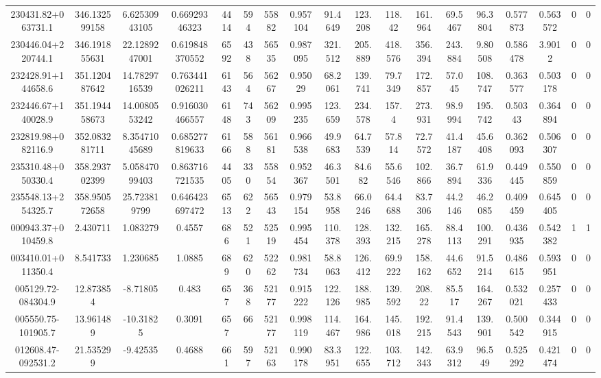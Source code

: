 \begin{table}
\begin{tabular}{cccccccccccccccccc}
230431.82+063731.1 & 346.132599158 & 6.62530943105 & 0.66929346323 & 4414 & 594 & 55882 & 0.957104 & 91.4649 & 123.208 & 118.42 & 161.964 & 69.5467 & 96.3804 & 0.577873 & 0.563572 & 0 & 0 \\
230446.04+220744.1 & 346.191855631 & 22.1289247001 & 0.619848370552 & 6592 & 438 & 56535 & 0.987095 & 321.512 & 205.889 & 418.576 & 356.394 & 243.884 & 9.80508 & 0.586478 & 3.9012 & 0 & 0 \\
232428.91+144658.6 & 351.120487642 & 14.7829716539 & 0.763441026211 & 6143 & 564 & 56267 & 0.95029 & 68.2061 & 139.741 & 79.7349 & 172.857 & 57.045 & 108.747 & 0.363577 & 0.503178 & 0 & 0 \\
232446.67+140028.9 & 351.194458673 & 14.0080553242 & 0.916030466557 & 6148 & 743 & 56209 & 0.995235 & 123.659 & 234.578 & 157.4 & 273.931 & 98.9994 & 195.742 & 0.50343 & 0.364894 & 0 & 0 \\
232819.98+082116.9 & 352.083281711 & 8.35471045689 & 0.685277819633 & 6166 & 588 & 56181 & 0.966538 & 49.9683 & 64.7539 & 57.814 & 72.7572 & 41.4187 & 45.6408 & 0.362093 & 0.506307 & 0 & 0 \\
235310.48+050330.4 & 358.293702399 & 5.05847099403 & 0.863716721535 & 4405 & 330 & 55854 & 0.952367 & 46.3501 & 84.682 & 55.6546 & 102.866 & 36.7894 & 61.9336 & 0.449445 & 0.550859 & 0 & 0 \\
235548.13+254325.7 & 358.950572658 & 25.723819799 & 0.646423697472 & 6513 & 622 & 56543 & 0.979154 & 53.8958 & 66.0246 & 64.4688 & 83.7306 & 44.2146 & 46.2085 & 0.409459 & 0.645405 & 0 & 0 \\
000943.37+010459.8 & 2.430711 & 1.083279 & 0.4557 & 686 & 521 & 52519 & 0.995454 & 110.378 & 128.393 & 132.215 & 165.278 & 88.4113 & 100.291 & 0.436935 & 0.542382 & 1 & 1 \\
003410.01+011350.4 & 8.541733 & 1.230685 & 1.0885 & 689 & 620 & 52262 & 0.981734 & 58.8063 & 126.412 & 69.9222 & 158.162 & 44.6652 & 91.5214 & 0.486615 & 0.593951 & 0 & 0 \\
005129.72-084304.9 & 12.873854 & -8.71805 & 0.483 & 657 & 368 & 52177 & 0.915222 & 122.126 & 188.985 & 139.592 & 208.22 & 85.517 & 164.267 & 0.532021 & 0.257433 & 0 & 0 \\
005550.75-101905.7 & 13.961489 & -10.31825 & 0.3091 & 657 & 66 & 52177 & 0.998119 & 114.467 & 164.986 & 145.018 & 192.215 & 91.4543 & 139.901 & 0.500542 & 0.344915 & 0 & 0 \\
012608.47-092531.2 & 21.535299 & -9.42535 & 0.4688 & 661 & 597 & 52163 & 0.990178 & 83.3951 & 122.655 & 103.712 & 142.343 & 63.9312 & 96.549 & 0.525292 & 0.421474 & 0 & 0 \\

\end{tabular}
\end{table}
